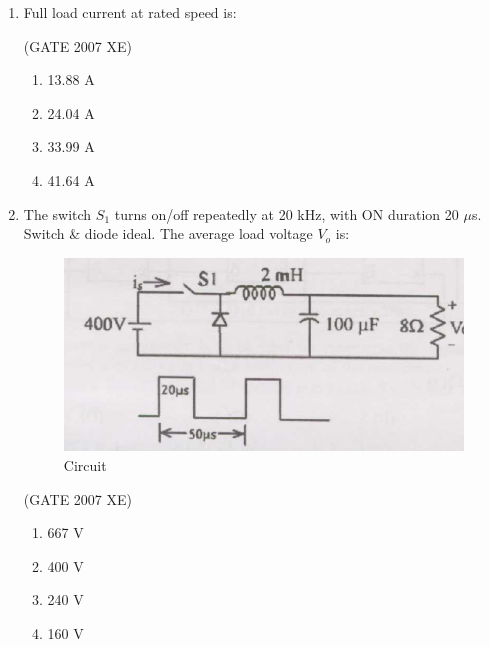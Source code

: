 \documentclass[journal,cmex10]{IEEEtran}
\theoremstyle{remark}
\numberwithin{equation}{enumi}
\numberwithin{figure}{enumi}
\begin{document}
\begin{enumerate}
    \item Full load current at rated speed is:

    \hfill{(GATE 2007 XE)}
    \begin{multicols}{4}
    \begin{enumerate}
        \item 13.88 A
        \item 24.04 A
        \item 33.99 A
        \item 41.64 A
    \end{enumerate}
\end{multicols}

\newpage

    \item The switch $S_1$ turns on/off repeatedly at 20 kHz, with ON duration 20 $\mu$s. Switch \& diode ideal. The average load voltage $V_o$ is:
    \begin{figure}[htbp]
  \centering
  \includegraphics[width=0.6\columnwidth]{figs/C/fig13.png}
  \caption{Circuit}
  \label{fig:C/fig13.png}
\end{figure}
    \hfill{(GATE 2007 XE)}
    \begin{multicols}{4}
    \begin{enumerate}
        \item 667 V
        \item 400 V
        \item 240 V
        \item 160 V
    \end{enumerate}
    \end{multicols}
    


\end{enumerate}
\end{document}
